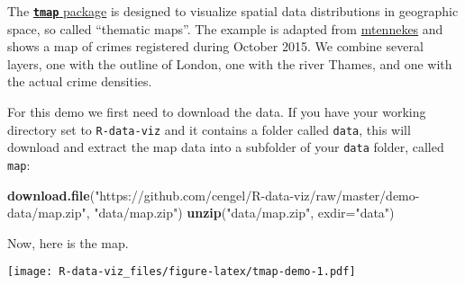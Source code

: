 \documentclass[]{book}
\newenvironment{Shaded}{\begin{snugshade}}{\end{snugshade}}
\newcommand{\KeywordTok}[1]{\textcolor[rgb]{0.13,0.29,0.53}{\textbf{#1}}}
\newcommand{\DataTypeTok}[1]{\textcolor[rgb]{0.13,0.29,0.53}{#1}}
\newcommand{\StringTok}[1]{\textcolor[rgb]{0.31,0.60,0.02}{#1}}
\newcommand{\NormalTok}[1]{#1}
\theoremstyle{definition}
\theoremstyle{definition}
\theoremstyle{definition}
\theoremstyle{remark}
\begin{document}
The
\href{https://CRAN.R-project.org/package=tmap}{\textbf{\texttt{tmap}}
package} is designed to visualize spatial data distributions in
geographic space, so called ``thematic maps''. The example is adapted
from
\href{https://github.com/mtennekes/tmap/tree/master/demo/LondonCrimes}{mtennekes}
and shows a map of crimes registered during October 2015. We combine
several layers, one with the outline of London, one with the river
Thames, and one with the actual crime densities.

For this demo we first need to download the data. If you have your
working directory set to \texttt{R-data-viz} and it contains a folder
called \texttt{data}, this will download and extract the map data into a
subfolder of your \texttt{data} folder, called \texttt{map}:

\begin{Shaded}
\begin{Highlighting}[]
\KeywordTok{download.file}\NormalTok{(}\StringTok{"https://github.com/cengel/R-data-viz/raw/master/demo-data/map.zip"}\NormalTok{,}
              \StringTok{"data/map.zip"}\NormalTok{)}
\KeywordTok{unzip}\NormalTok{(}\StringTok{"data/map.zip"}\NormalTok{, }\DataTypeTok{exdir=}\StringTok{"data"}\NormalTok{)}
\end{Highlighting}
\end{Shaded}

Now, here is the map.

\texttt{[image: R-data-viz\_files/figure-latex/tmap-demo-1.pdf]}
\end{document}

